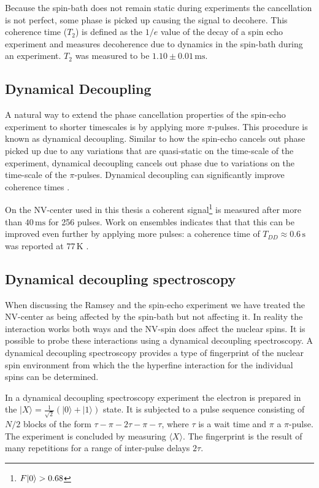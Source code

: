 Because the spin-bath does not remain static during experiments the cancellation is not perfect, some phase is picked up causing the signal to decohere.
This coherence time ($T_2$) is defined as the $1/e$ value of the decay of a spin echo experiment and measures decoherence due to dynamics in the spin-bath during an experiment.
$T_2$ was measured to be $1.10 \pm 0.01\, \mathrm{ms}$.

\subsection{Dynamical Decoupling}
A natural way to extend the phase cancellation properties of the spin-echo experiment to shorter timescales is by applying more $\pi$-pulses.
This procedure is known as dynamical decoupling.
Similar to how the spin-echo cancels out phase picked up due to any variations that are quasi-static on the time-scale of the experiment, dynamical decoupling cancels out phase due to variations on the time-scale of the $\pi$-pulses.
Dynamical decoupling can significantly improve coherence times \citep{Lange2010Universal}.

On the NV-center used in this thesis a coherent signal\footnote{$F{\left\vert{0}\right\rangle} > 0.68$} is measured after more than $40 \,\mathrm{ms}$ for 256 pulses.
Work on ensembles indicates that that this can be improved even further by applying more pulses: a coherence time of $T_{DD} \approx 0.6 \, \mathrm{s}$ was reported at $77\, \mathrm{K}$ \citep{Gill2013SolidState}.

\subsection{Dynamical decoupling spectroscopy}



When discussing the Ramsey and the spin-echo experiment we have treated the NV-center as being affected by the spin-bath but not affecting it.
In reality the interaction works both ways and the NV-spin does affect the nuclear spins.
It is possible to probe these interactions using a dynamical decoupling spectroscopy.
A dynamical decoupling spectroscopy provides a type of fingerprint of the nuclear spin environment from which the the hyperfine interaction for the individual spins can be determined.

In a dynamical decoupling spectroscopy experiment the electron is prepared in the $|X\rangle =\tfrac{1}{\sqrt{2}}\left( |0\rangle +|1\rangle \right) $ state.
It is subjected to a pulse sequence consisting of $N/2$ blocks of the form {$\tau - \pi -2\tau-\pi-\tau$}, where $\tau$ is a wait time and $\pi$ a $\pi$-pulse.
The experiment is concluded by measuring $\langle X\rangle $.
The fingerprint is the result of many repetitions for a range of inter-pulse delays $2\tau$.

